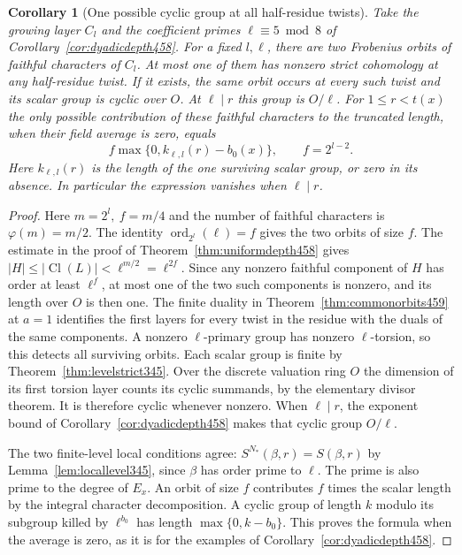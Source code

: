 \documentclass[a4paper,11pt]{article}
\newtheorem{corollary}[proposition]{Corollary}
\theoremstyle{definition}
\theoremstyle{remark}
\numberwithin{equation}{section}
\newcommand{\Cl}{\operatorname{Cl}}
\begin{document}
\begin{corollary}[One possible cyclic group at all half-residue twists]\leavevmode
\label{cor:dyadicorbit459}
Take the growing layer \(C_l\) and the coefficient primes
\(\ell\equiv5\bmod8\) of Corollary~\ref{cor:dyadicdepth458}.
For a fixed \(l,\ell\), there are two Frobenius orbits of faithful
characters of \(C_l\). At most one of them has nonzero strict
cohomology at any half-residue twist. If it exists, the same
orbit occurs at every such twist and its scalar group is cyclic
over \(O\). At \(\ell\mid r\) this group is \(O/\ell\).
For \(1\le r<t(x)\) the only possible contribution of
these faithful characters to the truncated length, when their
field average is zero, equals
\[
    f\max\{0,k_{\ell,l}(r)-b_0(x)\},
    \qquad f=2^{l-2}.
\]
Here \(k_{\ell,l}(r)\) is the length of the one surviving scalar
group, or zero in its absence. In particular the expression
vanishes when \(\ell\mid r\).
\end{corollary}
\begin{proof}
Here \(m=2^l,\ f=m/4\) and the number of faithful characters is
\(\varphi(m)=m/2\). The identity
\(\operatorname{ord}_{2^l}(\ell)=f\) gives the two orbits of
size \(f\). The estimate in the proof of
Theorem~\ref{thm:uniformdepth458} gives
\(|H|\le|\Cl(L)|<\ell^{m/2}=\ell^{2f}\).
Since any nonzero faithful component of \(H\) has order at
least \(\ell^f\), at most one of the two such components is
nonzero, and its length over \(O\) is then one. The finite
duality in Theorem~\ref{thm:commonorbits459} at \(a=1\)
identifies the first layers for every twist in the residue with
the duals of the same components. A nonzero \(\ell\)-primary
group has nonzero \(\ell\)-torsion, so this detects all
surviving orbits. Each scalar group is finite by
Theorem~\ref{thm:levelstrict345}. Over the discrete valuation
ring \(O\) the dimension of its first torsion layer counts its
cyclic summands, by the elementary divisor theorem. It is
therefore cyclic whenever nonzero. When \(\ell\mid r\), the
exponent bound of Corollary~\ref{cor:dyadicdepth458} makes
that cyclic group \(O/\ell\).

The two finite-level local conditions agree:
\(S^{N_*}(\beta,r)=S(\beta,r)\) by
Lemma~\ref{lem:locallevel345}, since \(\beta\) has order prime
to \(\ell\). The prime is also prime to the degree of \(E_x\).
An orbit of size \(f\) contributes \(f\) times the scalar
length by the integral character decomposition. A cyclic group
of length \(k\) modulo its subgroup killed by \(\ell^{b_0}\)
has length \(\max\{0,k-b_0\}\). This proves the formula when
the average is zero, as it is for the examples of
Corollary~\ref{cor:dyadicdepth458}.
\end{proof}
\end{document}
